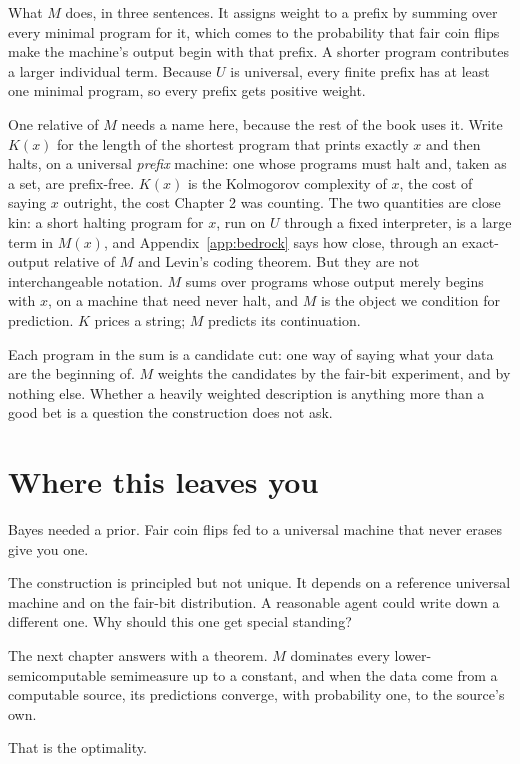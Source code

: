 What $M$ does, in three sentences. It assigns weight to a prefix by summing over every minimal program for it, which comes to the probability that fair coin flips make the machine's output begin with that prefix. A shorter program contributes a larger individual term. Because $U$ is universal, every finite prefix has at least one minimal program, so every prefix gets positive weight.

One relative of $M$ needs a name here, because the rest of the book uses it. Write $K(x)$ for the length of the shortest program that prints exactly $x$ and then halts, on a universal \emph{prefix} machine: one whose programs must halt and, taken as a set, are prefix-free. $K(x)$ is the Kolmogorov complexity of $x$, the cost of saying $x$ outright, the cost Chapter 2 was counting. The two quantities are close kin: a short halting program for $x$, run on $U$ through a fixed interpreter, is a large term in $M(x)$, and Appendix~\ref{app:bedrock} says how close, through an exact-output relative of $M$ and Levin's coding theorem. But they are not interchangeable notation. $M$ sums over programs whose output merely begins with $x$, on a machine that need never halt, and $M$ is the object we condition for prediction. $K$ prices a string; $M$ predicts its continuation.

Each program in the sum is a candidate cut: one way of saying what your data are the beginning of. $M$ weights the candidates by the fair-bit experiment, and by nothing else. Whether a heavily weighted description is anything more than a good bet is a question the construction does not ask.

\section*{Where this leaves you}

Bayes needed a prior. Fair coin flips fed to a universal machine that never erases give you one.

The construction is principled but not unique. It depends on a reference universal machine and on the fair-bit distribution. A reasonable agent could write down a different one. Why should this one get special standing?

The next chapter answers with a theorem. $M$ dominates every lower-semicomputable semimeasure up to a constant, and when the data come from a computable source, its predictions converge, with probability one, to the source's own.

That is the optimality.

